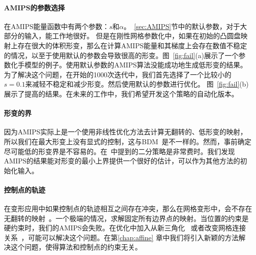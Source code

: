 \paragraph{AMIPS的参数选择}
在AMIPS能量函数中有两个参数：$s$和$\alpha$。~\ref{sec:AMIPS}节中的默认参数，对于大部分的输入，能工作地很好。
但是在刚性网格参数化中，如果在初始的凸圆盘映射上存在很大的体积形变，那么在计算AMIPS能量和其梯度上会存在数值不稳定的情况，以至于使用默认的参数会导致很高的形变。图~\ref{fig:fail}(a)展示了一个参数化手模型的例子。使用默认参数的AMIPS算法没能成功地生成低形变的结果。为了解决这个问题，在开始的1000次迭代中，我们首先选择了一个比较小的$s = 0.1$来减轻不稳定和减少形变。然后使用默认的参数进行优化。 图~\ref{fig:fail}(b)展示了提高的结果。在未来的工作中，我们希望开发这个策略的自动化版本。

\paragraph{形变的界}
因为AMIPS实际上是一个使用非线性优化方法去计算无翻转的、低形变的映射，所以我们在最大形变上没有显式的控制，这与BDM~\cite{Lipman2012,Aigerman2013,Aigerman2014,Poranne2014}是不一样的。然而，事前确定尽可能低的形变界是不容易的。在~\cite{Lipman2012}中提到的二分策略是非常费时。我们发现AMIPS的结果能对形变的最小上界提供一个很好的估计，可以作为其他方法的初始化输入。

\paragraph{控制点的轨迹}
在变形应用中如果控制点的轨迹相互之间存在冲突，那么在网格变形中，会不存在无翻转的映射~\cite{Jin2014}。一个极端的情况，求解固定所有边界点的映射。当位置的约束是硬约束时，我们的AMIPS会失败。在优化中加入从新三角化~\cite{Weber2014} 或者改变网格连接关系~\cite{Jin2014}，可能可以解决这个问题。在第\ref{chap:affine} 章中我们将引入新颖的方法解决这个问题，使得算法和控制点的约束无关。
